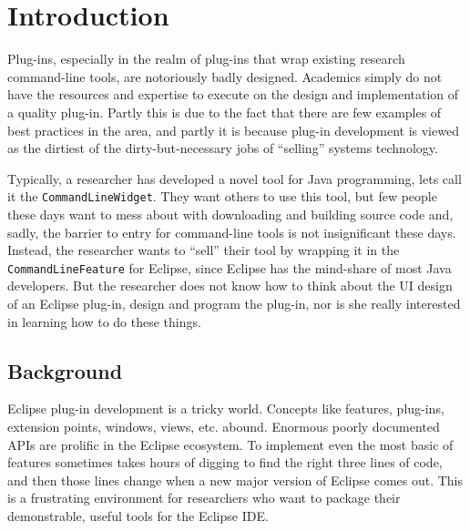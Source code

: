 \documentclass[conference]{IEEEtran}
\begin{document}

%
\IEEEpeerreviewmaketitle


\section{Introduction}
\label{sec:introduction}

Plug-ins, especially in the realm of plug-ins that wrap existing
research command-line tools, are notoriously badly designed.
Academics simply do not have the resources and expertise to execute on
the design and implementation of a quality plug-in.  Partly this is due
to the fact that there are few examples of best practices in the area,
and partly it is because plug-in development is viewed as the dirtiest
of the dirty-but-necessary jobs of ``selling'' systems technology.

Typically, a researcher has developed a novel tool for Java
programming, lets call it the \texttt{CommandLineWidget}.  They want
others to use this tool, but few people these days want to mess about
with downloading and building source code and, sadly, the barrier to
entry for command-line tools is not insignificant these days.
Instead, the researcher wants to ``sell'' their tool by wrapping it in
the \texttt{CommandLineFeature} for Eclipse, since Eclipse has the
mind-share of most Java developers.  But the researcher does not know
how to think about the UI design of an Eclipse plug-in, design and
program the plug-in, nor is she really interested in learning how to
do these things.

%
\subsection{Background}
\label{sec:background}

Eclipse plug-in development is a tricky world.  Concepts like features,
plug-ins, extension points, windows, views, etc. abound.  Enormous
poorly documented APIs are prolific in the Eclipse ecosystem.  To
implement even the most basic of features sometimes takes hours of
digging to find the right three lines of code, and then those lines
change when a new major version of Eclipse comes out.  This is a
frustrating environment for researchers who want to package their
demonstrable, useful tools for the Eclipse IDE.
\end{document}
